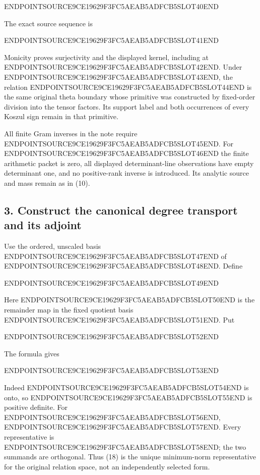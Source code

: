 ENDPOINTSOURCE9CE19629F3FC5AEAB5ADFCB5SLOT40END

The exact source sequence is

ENDPOINTSOURCE9CE19629F3FC5AEAB5ADFCB5SLOT41END

Monicity proves surjectivity and the displayed kernel, including at ENDPOINTSOURCE9CE19629F3FC5AEAB5ADFCB5SLOT42END. Under ENDPOINTSOURCE9CE19629F3FC5AEAB5ADFCB5SLOT43END, the relation ENDPOINTSOURCE9CE19629F3FC5AEAB5ADFCB5SLOT44END is the same original theta boundary whose primitive was constructed by fixed-order division into the tensor factors. Its support label and both occurrences of every Koszul sign remain in that primitive.

All finite Gram inverses in the note require ENDPOINTSOURCE9CE19629F3FC5AEAB5ADFCB5SLOT45END. For ENDPOINTSOURCE9CE19629F3FC5AEAB5ADFCB5SLOT46END the finite arithmetic packet is zero, all displayed determinant-line observations have empty determinant one, and no positive-rank inverse is introduced. Its analytic source and mass remain as in (10).

\subsection{3. Construct the canonical degree transport and its adjoint}\label{endpoint-restriction_original--construct-the-canonical-degree-transport-and-its-adjoint}

Use the ordered, unscaled basis ENDPOINTSOURCE9CE19629F3FC5AEAB5ADFCB5SLOT47END of ENDPOINTSOURCE9CE19629F3FC5AEAB5ADFCB5SLOT48END. Define

ENDPOINTSOURCE9CE19629F3FC5AEAB5ADFCB5SLOT49END

Here ENDPOINTSOURCE9CE19629F3FC5AEAB5ADFCB5SLOT50END is the remainder map in the fixed quotient basis ENDPOINTSOURCE9CE19629F3FC5AEAB5ADFCB5SLOT51END. Put

ENDPOINTSOURCE9CE19629F3FC5AEAB5ADFCB5SLOT52END

The formula gives

ENDPOINTSOURCE9CE19629F3FC5AEAB5ADFCB5SLOT53END

Indeed ENDPOINTSOURCE9CE19629F3FC5AEAB5ADFCB5SLOT54END is onto, so ENDPOINTSOURCE9CE19629F3FC5AEAB5ADFCB5SLOT55END is positive definite. For ENDPOINTSOURCE9CE19629F3FC5AEAB5ADFCB5SLOT56END, ENDPOINTSOURCE9CE19629F3FC5AEAB5ADFCB5SLOT57END. Every representative is ENDPOINTSOURCE9CE19629F3FC5AEAB5ADFCB5SLOT58END; the two summands are orthogonal. Thus (18) is the unique minimum-norm representative for the original relation space, not an independently selected form.

